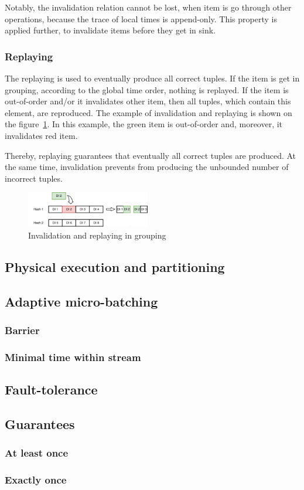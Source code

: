 Notably, the invalidation relation cannot be lost, when item is go through other operations, because the trace of local times is append-only. This property is applied further, to invalidate items before they get in sink.

\subsubsection{Replaying}

The replaying is used to eventually produce all correct tuples. If the item is get in grouping, according to the global time order, nothing is replayed. If the item is out-of-order and/or it invalidates other item, then all tuples, which contain this element, are reproduced. The example of invalidation and replaying is shown on the figure~\ref{grouping-invalidation-figure}. In this example, the green item is out-of-order and, moreover, it invalidates red item.

Thereby, replaying guarantees that eventually all correct tuples are produced. At the same time, invalidation prevents from producing the unbounded number of incorrect tuples. 

\begin{figure}[htbp]
  \centering
  \includegraphics[width=0.48\textwidth]{pics/grouping-invalidation}
  \caption{Invalidation and replaying in grouping}
  \label {grouping-invalidation-figure}
\end{figure}

\subsection{Physical execution and partitioning}

\subsection{Adaptive micro-batching}

\subsubsection{Barrier}

\subsubsection{Minimal time within stream}

\subsection{Fault-tolerance}

\subsection{Guarantees}

\subsubsection{At least once}

\subsubsection{Exactly once}




